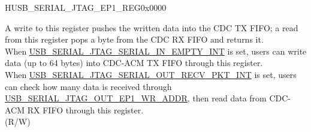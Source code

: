 \begin{register}{H}{USB\_SERIAL\_JTAG\_EP1\_REG}{0x0000}\label{regdesc:USBSERIALJTAGEP1REG}
%
%
\regnewline%
\begin{regdesc}\begin{reglist}
\label{fielddesc:USBSERIALJTAGRDWRBYTE}\item [USB\_SERIAL\_JTAG\_RDWR\_BYTE] A write to this register pushes the written data into the CDC TX FIFO; a read from this register pops a byte from the CDC RX FIFO and returns it. \\
When \hyperref[int:USBSERIALJTAGSERIALINEMPTYINT]{USB\_SERIAL\_JTAG\_SERIAL\_IN\_EMPTY\_INT} is set, users can write data (up to 64 bytes) into CDC-ACM TX FIFO through this register.\\
When \hyperref[int:USBSERIALJTAGSERIALOUTRECVPKTINT]{USB\_SERIAL\_JTAG\_SERIAL\_OUT\_RECV\_PKT\_INT} is set, users can check how many data is received through \hyperref[fielddesc:USBSERIALJTAGOUTEP1WRADDR]{USB\_SERIAL\_JTAG\_OUT\_EP1\_WR\_ADDR}, then read data from CDC-ACM RX FIFO through this register. \\
(R/W)
\end{reglist}\end{regdesc}
\end{register}


